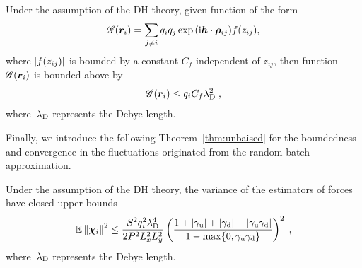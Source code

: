 \begin{lem} \label{lem::upper_bound_phiRB}
  Under the assumption of the DH theory, given function of the form 
    \begin{equation}
       \mathscr{G}(\boldsymbol{r}_i)=\sum_{j\neq i}q _i q_{j}\exp{(\mathrm{i} \boldsymbol{h} \cdot \boldsymbol{\rho}_{ij})}f(z_{ij}),
    \end{equation}
 where $\lvert f(z_{ij})\rvert$ is bounded by  a constant $C_f$ independent of $z_{ij}$, then function $ \mathscr{G}(\boldsymbol{r}_i)$ is bounded above by
    \begin{equation}
         \mathscr{G}(\boldsymbol{r}_i)\leq q_i  C_f\lambda_{\mathrm{D}}^2\;,
    \end{equation}
    where~$\lambda_{\mathrm{D}}$  represents the Debye length.
\end{lem}
Finally, we introduce the following Theorem~\ref{thm:unbaised} for the boundedness and convergence in the fluctuations originated from the random batch approximation.
\begin{thm}\label{thm:unbaised}
	Under the assumption of the DH theory,   the variance  of the estimators of   forces have closed upper bounds
	\begin{equation}
		  \mathbb{E}\left\lVert\boldsymbol{\chi}_{i}\right\rVert^2\leq\frac{ S^2q_i^2\lambda_{\mathrm{D}}^4}{2P ^2 L_x^2L_y^2}\left( \frac{1+\left\lvert\gamma_{\mathrm{u}}\right\rvert+\left\lvert\gamma_{\mathrm{d}}\right\rvert+\left\lvert\gamma_{\mathrm{u}}\gamma_{\mathrm{d}}\right\rvert}{1-\max\{0,\gamma_{\mathrm{u}}\gamma_{\mathrm{d}}\}}\right)^2\;,
	\end{equation}
     where~$\lambda_{\mathrm{D}}$  represents the Debye length.
\end{thm}
